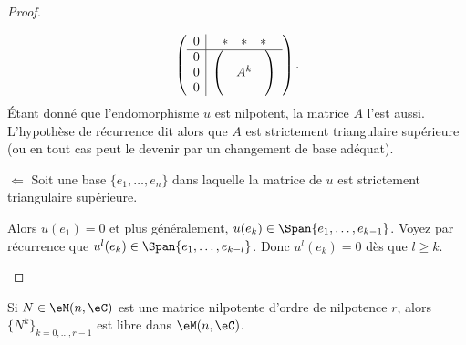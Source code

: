 \begin{proof}
\begin{subproof}
\begin{equation}
               \begin{pmatrix}
                       \begin{array}[]{c|c}
                           0&\begin{matrix}
                               * &   *    &   *
                           \end{matrix}\\
                           \hline
                           \begin{matrix}
                               0 \\
                               0 \\
                               0
                           \end{matrix}&
                           \begin{pmatrix}
                                &       &       \\
                                &   A^k &       \\
                                &       &
                           \end{pmatrix}
                       \end{array}
               \end{pmatrix}.
           \end{equation}
           Étant donné que l'endomorphisme \( u\) est nilpotent, la matrice \( A\) l'est aussi. L'hypothèse de récurrence dit alors que \( A\) est strictement triangulaire supérieure (ou en tout cas peut le devenir par un changement de base adéquat).

       \item[\( \Leftarrow\)]
           Soit une base \( \{ e_1,\ldots, e_n \}  \) dans laquelle la matrice de \( u\) est strictement triangulaire supérieure.

           Alors \( u(e_1)=0\) et plus généralement, \( u(e_k)\in \Span\{ e_1,\ldots, e_{k-1} \}\). Voyez par récurrence que \( u^l(e_k)\in \Span\{ e_1,\ldots, e_{k-l} \}\). Donc \( u^l(e_k)=0\) dès que \( l\geq k\).
    \end{subproof}
\end{proof}

\begin{lemma}        \label{LEMooKPWKooOacXju}
    Si \( N\in \eM(n,\eC)\) est une matrice nilpotente d'ordre de nilpotence \( r\), alors \( \{ N^k \}_{k=0,\ldots, r-1}\) est libre dans \( \eM(n,\eC)\).
\end{lemma}

